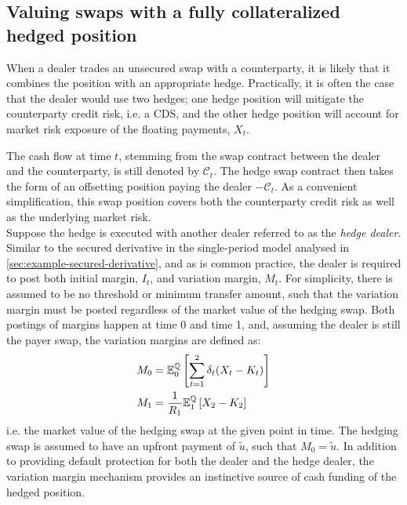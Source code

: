 \documentclass[main.tex]{subfiles}
\begin{document}
    \subsection{Valuing swaps with a fully collateralized hedged position}
        When a dealer trades an unsecured swap with a counterparty,
        it is likely that it combines the position with an appropriate hedge.
        Practically, it is often the case that the dealer would use two hedges;
        one hedge position will mitigate the counterparty credit risk, i.e. a CDS,
        and the other hedge position will account for market risk exposure of the floating payments, $X_t$.
        
        The cash flow at time $t$, stemming from the swap contract between the dealer and the counterparty,
        is still denoted by $\mathcal{C}_t$.
        The hedge swap contract then takes the form of an offsetting position paying the dealer $-\mathcal{C}_t$.
        As a convenient simplification, this swap position covers both the counterparty credit risk as well as the underlying market risk.
        \\
        Suppose the hedge is executed with another dealer referred to as the \textit{hedge dealer}.
        Similar to the secured derivative in the single-period model analysed in \cref{sec:example-secured-derivative},
        and as is common practice,
        the dealer is required to post both initial margin, $I_{t}$, and variation margin, $M_{t}$.
        For simplicity, there is assumed to be no threshold or minimum transfer amount,
        such that the variation margin must be posted regardless of the market value of the hedging swap.
        Both postings of margins happen at time 0 and time 1,
        and, assuming the dealer is still the payer swap,
        the variation margins are defined as:
        \begin{align}
            M_0 &= \mathbb{E}_{0}^{\mathbb{Q}}\left[\sum_{t=1}^{2}\delta_t (X_t - K_t)\right]
            \\
            M_1 &= \frac{1}{R_1}\mathbb{E}_{1}^{\mathbb{Q}}\left[X_2 - K_2\right] 
        \end{align}
        i.e. the market value of the hedging swap at the given point in time.
        The hedging swap is assumed to have an upfront payment of $\tilde{u}$, such that $M_0 = \tilde{u}$.
        In addition to providing default protection for both the dealer and the hedge dealer,
        the variation margin mechanism provides an instinctive source of cash funding of the hedged position. 
\end{document}
